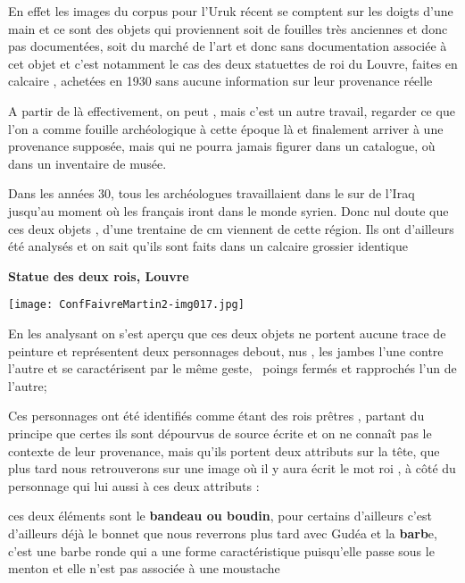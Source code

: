\documentclass[a4paper]{article}
\begin{document}
\bigskip

{
En effet les images du corpus pour l'Uruk récent se comptent sur les doigts d'une main et ce sont des objets qui
proviennent soit de fouilles très anciennes et donc pas documentées, soit du marché de l'art et donc sans documentation
associée à cet objet et c'est notamment le cas des deux statuettes de roi du Louvre, faites en calcaire , achetées en
1930 sans aucune information sur leur provenance réelle}


\bigskip

{
A partir de là effectivement, on peut , mais c'est un autre travail, regarder ce que l'on a comme fouille archéologique
à cette époque là et finalement arriver à une provenance supposée, mais qui ne pourra jamais figurer dans un catalogue,
où dans un inventaire de musée.}

{
Dans les années 30, tous les archéologues travaillaient dans le sur de l'Iraq jusqu'au moment où les français iront dans
le monde syrien. Donc nul doute que ces deux objets , d'une trentaine de cm viennent de cette région. Ils ont
d'ailleurs été analysés et on sait qu'ils sont faits dans un calcaire grossier identique}


\bigskip


\bigskip

{
\textbf{Statue des deux rois, Louvre}}


\bigskip

 \texttt{[image: ConfFaivreMartin2-img017.jpg]} 


\bigskip


\bigskip

{
En les analysant on s'est aperçu que ces deux objets ne portent aucune trace de peinture et représentent deux
personnages debout, nus , les jambes l'une contre l'autre et se caractérisent par le même geste, \ poings fermés et
rapprochés l'un de l'autre; }

{
Ces personnages ont été identifiés comme étant des rois prêtres , partant du principe que certes ils sont dépourvus de
source écrite et on ne connaît pas le contexte de leur provenance, mais qu'ils portent deux attributs sur la tête, que
plus tard nous retrouverons sur une image où il y aura écrit le mot roi , à côté du personnage qui lui aussi à ces deux
attributs : }

{
ces deux éléments sont le \textbf{bandeau ou boudin}, pour certains d'ailleurs c'est d'ailleurs déjà le bonnet que nous
reverrons plus tard avec Gudéa et la \textbf{barb}e, c'est une barbe ronde qui a une forme caractéristique puisqu'elle
passe sous le menton et elle n'est pas associée à une moustache}
\end{document}

